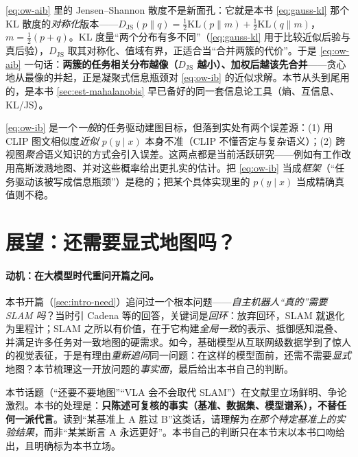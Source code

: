 \begin{insight}
\cref{eq:ow-aib} 里的 Jensen--Shannon 散度不是新面孔：它就是本书 \cref{eq:gauss-kl} 那个 KL 散度的\emph{对称化}版本——$D_{\mathrm{JS}}(p\|q)=\tfrac12\mathrm{KL}(p\|m)+\tfrac12\mathrm{KL}(q\|m)$，$m=\tfrac12(p+q)$。KL 度量“两个分布有多不同”（\cref{eq:gauss-kl} 用于比较近似后验与真后验），$D_{\mathrm{JS}}$ 取其对称化、值域有界，正适合当“合并两簇的代价”。于是 \cref{eq:ow-aib} 一句话：\textbf{两簇的任务相关分布越像（$D_{\mathrm{JS}}$ 越小）、加权后越该先合并}——贪心地从最像的并起，正是凝聚式信息瓶颈对 \cref{eq:ow-ib} 的近似求解。本节从头到尾用的，是本书 \cref{sec:est-mahalanobis} 早已备好的同一套信息论工具（熵、互信息、KL/JS）。
\end{insight}

\begin{pitfall}[信息瓶颈的两处误差来源]
\cref{eq:ow-ib} 是一个\emph{一般}的任务驱动建图目标，但落到实处有两个误差源\cite{paull2026openworld}：(1) 用 CLIP 图文相似度\emph{近似} $p(y\mid x)$ 本身不准（CLIP 不懂否定与复杂语义）；(2) 跨视图\emph{聚合}语义知识的方式会引入误差。这两点都是当前活跃研究——例如有工作改用高斯泼溅地图、并对这些概率给出更扎实的估计。把 \cref{eq:ow-ib} 当成\emph{框架}（“任务驱动该被写成信息瓶颈”）是稳的；把某个具体实现里的 $p(y\mid x)$ 当成精确真值则不稳。
\end{pitfall}

\section{展望：还需要显式地图吗？}
\label{sec:openworld-future}

\paragraph{动机：在大模型时代重问开篇之问。}
本书开篇（\cref{sec:intro-need}）追问过一个根本问题——\emph{自主机器人“真的”需要 SLAM 吗}？当时引 Cadena 等的回答，关键词是\emph{回环}：放弃回环，SLAM 就退化为里程计；SLAM 之所以有价值，在于它构建\emph{全局一致}的表示、抵御感知混叠、并满足许多任务对一致地图的硬需求。如今，基础模型从互联网级数据学到了惊人的视觉表征，于是有理由\emph{重新追问}同一问题：在这样的模型面前，还需不需要\emph{显式}地图？本节梳理这一开放问题的\emph{事实面}，最后给出本书自己的判断。

\begin{note}
本节话题（“还要不要地图”“VLA 会不会取代 SLAM”）在文献里立场鲜明、争论激烈。本书的处理是：\textbf{只陈述可复核的事实（基准、数据集、模型谱系），不替任何一派代言}。读到“某基准上 A 胜过 B”这类话，请理解为\emph{在那个特定基准上的实验结果}，而非“某某断言 A 永远更好”。本书自己的判断只在本节末以本书口吻给出，且明确标为本书立场。
\end{note}

